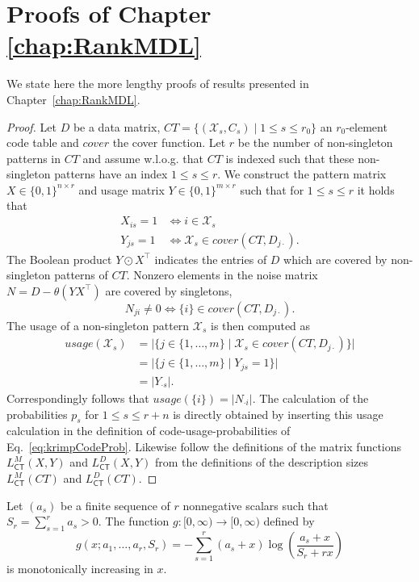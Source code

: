 \chapter{Proofs of Chapter \ref{chap:RankMDL}}\label{chap:AppendixMDL}
We state here the more lengthy proofs of results presented in Chapter~\ref{chap:RankMDL}.
\lctbmf*
\begin{proof}
Let $D$ be a data matrix, $CT=\{(\mathcal{X}_s,C_s)\mid 1\leq  s\leq r_0\}$ an $r_0$-element code table and $cover$ the cover function. Let $r$ be the number of non-singleton patterns in $CT$ and assume w.l.o.g. that $CT$ is indexed such that these non-singleton patterns have an index $1\leq s \leq r$. We construct the pattern matrix $X\in \{0,1\}^{n\times r}$ and usage matrix $Y\in \{0,1\}^{m\times r}$ such that for $1\leq s\leq r$ it holds that
\begin{align*}
X_{is}=1&\Leftrightarrow i\in \mathcal{X}_s\\
Y_{js}=1&\Leftrightarrow \mathcal{X}_s\in cover(CT,D_{j\cdot}).
\end{align*}
The Boolean product $Y\odot X^\top$ indicates the entries of $D$ which are covered by non-singleton patterns of $CT$. Nonzero elements in the noise matrix $N=D-\theta(YX^\top)$ are covered by singletons, 
\[N_{ji}\neq 0\Leftrightarrow \{i\}\in cover(CT,D_{j\cdot}).\]
The usage of a non-singleton pattern $\mathcal{X}_s$ is then computed as
\begin{align*}
usage(\mathcal{X}_s)&=\lvert \{j\in\{1,\ldots,m\}\mid \mathcal{X}_s\in cover(CT,D_{j\cdot})\}\rvert \\
&=\lvert \{j\in\{1,\ldots,m\}\mid Y_{js}=1\}\rvert \\
&=\lvert Y_{\cdot s}\rvert .
\end{align*}
Correspondingly follows that $usage(\{i\})=\lvert N_{\cdot i}\rvert $. The calculation of the probabilities $p_s$ for $1\leq s \leq r+n$ is directly obtained by inserting this usage calculation in the definition of code-usage-probabilities of Eq.~\eqref{eq:krimpCodeProb}. Likewise follow the definitions of the matrix functions $L_{\mathsf{CT}}^M(X,Y)$ and $L_{\mathsf{CT}}^D(X,Y)$ from the definitions of the description sizes $L_{\mathsf{CT}}^M(CT)$ and $L_{\mathsf{CT}}^D(CT)$.
\end{proof}
\begin{lemma}\label{thm:monoticity}
Let $(a_s)$ be a finite sequence of $r$ nonnegative scalars such that $S_r=\sum_{s=1}^ra_s>0$. The function $g:[0,\infty)\rightarrow[0,\infty)$ defined by
\[g(x;a_1,\ldots,a_r,S_r)=-\sum_{s=1}^r(a_s+x)\log\left(\frac{a_s+x}{S_r+rx}\right)\]
is monotonically increasing in $x$.
\end{lemma}
